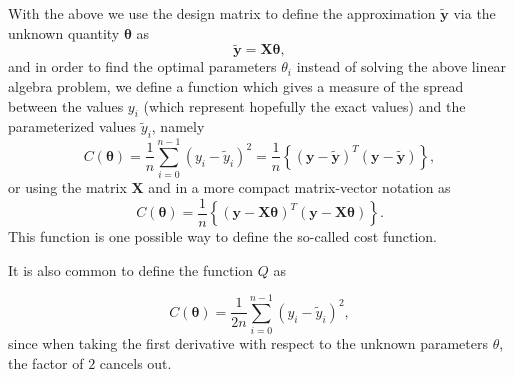 \documentclass[%
oneside,                 %
final,                   %
10pt]{article}
\newenvironment{block_mdfboxadmon}[1][]{
\begin{block_mdfboxmdframed}[frametitle=#1]
}
{
\end{block_mdfboxmdframed}
}
\begin{document}

\begin{block_mdfboxadmon}[]
With the above we use the design matrix to define the approximation $\bm{\tilde{y}}$ via the unknown quantity $\bm{\theta}$ as
\[
\bm{\tilde{y}}= \bm{X}\bm{\theta},
\]
and in order to find the optimal parameters $\theta_i$ instead of solving the above linear algebra problem, we define a function which gives a measure of the spread between the values $y_i$ (which represent hopefully the exact values) and the parameterized values $\tilde{y}_i$, namely
\[
C(\bm{\theta})=\frac{1}{n}\sum_{i=0}^{n-1}\left(y_i-\tilde{y}_i\right)^2=\frac{1}{n}\left\{\left(\bm{y}-\bm{\tilde{y}}\right)^T\left(\bm{y}-\bm{\tilde{y}}\right)\right\},
\]
or using the matrix $\bm{X}$ and in a more compact matrix-vector notation as
\[
C(\bm{\theta})=\frac{1}{n}\left\{\left(\bm{y}-\bm{X}\bm{\theta}\right)^T\left(\bm{y}-\bm{X}\bm{\theta}\right)\right\}.
\]
This function is one possible way to define the so-called cost function.



It is also common to define
the function $Q$ as

\[
C(\bm{\theta})=\frac{1}{2n}\sum_{i=0}^{n-1}\left(y_i-\tilde{y}_i\right)^2,
\]
since when taking the first derivative with respect to the unknown parameters $\theta$, the factor of $2$ cancels out.
\end{block_mdfboxadmon} %




\end{document}
